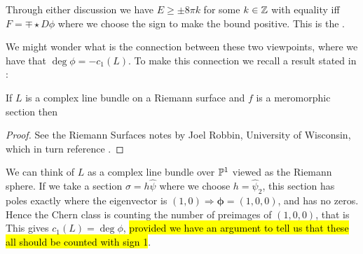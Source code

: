 \documentclass{article}
\begin{document}
Through either discussion we have $E\geq \pm 8\pi k$ for some $k \in \mathbb{Z}$ with equality iff $F=\mp \star D \phi$ where we choose the sign to make the bound positive. This is the .
\begin{remark}
	We might wonder what is the connection between these two viewpoints, where we have that $\deg \phi = -c_1(L)$. To make this connection we recall a result stated in \cite{Babelon2003}:
	\begin{prop}
		If $L$ is a complex line bundle on a Riemann surface and $f$ is a meromorphic section then 
	\end{prop}
\begin{proof}
	See the Riemann Surfaces notes by Joel Robbin, University of Wisconsin, which in turn reference \cite{Griffiths2014}. 
\end{proof}
We can think of $L$ as a complex line bundle over $\mathbb{P}^1$ viewed as the Riemann sphere. If we take a section $\sigma = h \hat{\psi}$ where we choose $h=\hat{\psi}_2$, this section has poles exactly where the eigenvector is $(1,0) \Rightarrow \bm{\phi} = (1,0,0)$, and has no zeros. Hence the Chern class is counting the number of preimages of $(1,0,0)$, that is 
This gives $c_1(L)=\deg \phi$, \hl{provided we have an argument to tell us that these all should be counted with sign 1}. 
\end{remark}

\end{document}
